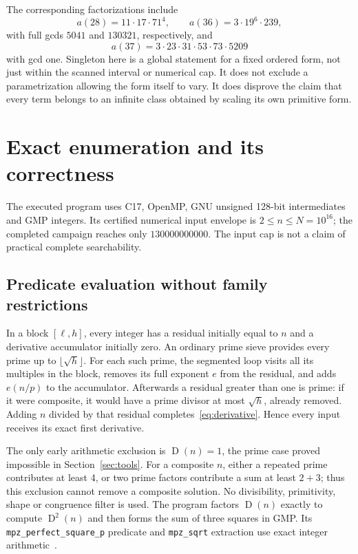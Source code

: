 \documentclass[11pt]{article}
\newcommand{\D}{\operatorname{D}}
\theoremstyle{definition}
\begin{document}
The corresponding factorizations include
\[
 a(28)=11\cdot17\cdot71^4,
 \qquad a(36)=3\cdot19^6\cdot239,
\]
with full gcds $5041$ and $130321$, respectively, and
\[
 a(37)=3\cdot23\cdot31\cdot53\cdot73\cdot5209
\]
with gcd one. Singleton here is a global statement for a fixed ordered
form, not just within the scanned interval or numerical cap. It does not
exclude a parametrization allowing the form itself to vary. It does
disprove the claim that every term belongs to an infinite class obtained
by scaling its own primitive form.

\section{Exact enumeration and its correctness}\label{sec:algorithm}
The executed program uses C17, OpenMP, GNU unsigned 128-bit intermediates
and GMP integers. Its certified numerical input envelope is
$2\le n\le N=10^{16}$; the completed campaign reaches only
$130000000000$. The input cap is not a claim of practical complete
searchability.

\subsection{Predicate evaluation without family restrictions}
In a block $[\ell,h]$, every integer has a residual initially equal to
$n$ and a derivative accumulator initially zero. An ordinary prime sieve
provides every prime up to $\lfloor\sqrt h\rfloor$. For each such prime,
the segmented loop visits all its multiples in the block, removes its
full exponent $e$ from the residual, and adds $e(n/p)$ to the accumulator.
Afterwards a residual greater than one is prime: if it were composite,
it would have a prime divisor at most $\sqrt h$, already removed.
Adding $n$ divided by that residual completes~\eqref{eq:derivative}.
Hence every input receives its exact first derivative.

The only early arithmetic exclusion is $\D(n)=1$, the prime case
proved impossible in Section~\ref{sec:tools}. For a composite $n$,
either a repeated prime contributes at least 4, or two prime factors
contribute a sum at least $2+3$; thus this exclusion cannot remove a
composite solution. No divisibility, primitivity, shape or congruence
filter is used. The program factors $\D(n)$ exactly to compute
$\D^2(n)$ and then forms the sum of three squares in GMP. Its
\texttt{mpz\_perfect\_square\_p} predicate and
\texttt{mpz\_sqrt} extraction use exact integer arithmetic~\cite{gmp}.
\end{document}
